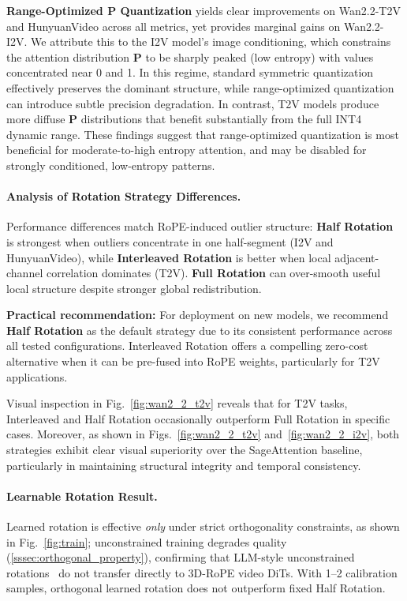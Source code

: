 \textbf{Range-Optimized $\mathbf{P}$ Quantization} yields clear improvements on Wan2.2-T2V and HunyuanVideo across all metrics, yet provides marginal gains on Wan2.2-I2V. We attribute this to the I2V model's image conditioning, which constrains the attention distribution $\mathbf{P}$ to be sharply peaked (low entropy) with values concentrated near 0 and 1. In this regime, standard symmetric quantization effectively preserves the dominant structure, while range-optimized quantization can introduce subtle precision degradation. In contrast, T2V models produce more diffuse $\mathbf{P}$ distributions that benefit substantially from the full INT4 dynamic range. These findings suggest that range-optimized quantization is most beneficial for moderate-to-high entropy attention, and may be disabled for strongly conditioned, low-entropy patterns.



\paragraph{\textbf{Analysis of Rotation Strategy Differences.}}
Performance differences match RoPE-induced outlier structure: \textbf{Half Rotation} is strongest when outliers concentrate in one half-segment (I2V and HunyuanVideo), while \textbf{Interleaved Rotation} is better when local adjacent-channel correlation dominates (T2V). \textbf{Full Rotation} can over-smooth useful local structure despite stronger global redistribution.

\textbf{Practical recommendation:} For deployment on new models, we recommend \textbf{Half Rotation} as the default strategy due to its consistent performance across all tested configurations. Interleaved Rotation offers a compelling zero-cost alternative when it can be pre-fused into RoPE weights, particularly for T2V applications.



Visual inspection in Fig.~\ref{fig:wan2_2_t2v} reveals that for T2V tasks, Interleaved and Half Rotation occasionally outperform Full Rotation in specific cases. Moreover, as shown in Figs.~\ref{fig:wan2_2_t2v} and~\ref{fig:wan2_2_i2v}, both strategies exhibit clear visual superiority over the SageAttention baseline, particularly in maintaining structural integrity and temporal consistency.
 

\paragraph{\textbf{Learnable Rotation Result.}}
Learned rotation is effective \emph{only} under strict orthogonality constraints, as shown in Fig.~\ref{fig:train}; unconstrained training degrades quality (\cref{sssec:orthogonal_property}), confirming that LLM-style unconstrained rotations~\cite{liu2025spinquant,sun2025flatquant} do not transfer directly to 3D-RoPE video DiTs. With 1--2 calibration samples, orthogonal learned rotation does not outperform fixed Half Rotation.


